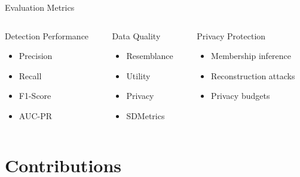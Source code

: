 \documentclass[aspectratio=169,xcolor={dvipsnames}]{beamer}
\begin{document}
\begin{frame}{Evaluation Metrics}
  \begin{columns}[T,onlytextwidth]
    \begin{column}{0.32\textwidth}
      \begin{block}{Detection Performance}
        \begin{itemize}
          \item Precision
          \item Recall
          \item F1-Score
          \item AUC-PR
        \end{itemize}
      \end{block}
    \end{column}
    \hspace{0.02\textwidth}
    \begin{column}{0.32\textwidth}
      \begin{block}{Data Quality}
        \begin{itemize}
          \item Resemblance
          \item Utility
          \item Privacy
          \item SDMetrics
        \end{itemize}
      \end{block}
    \end{column}
    \hspace{0.02\textwidth}
    \begin{column}{0.32\textwidth}
      \begin{block}{Privacy Protection}
        \begin{itemize}
          \item Membership inference
          \item Reconstruction attacks
          \item Privacy budgets
        \end{itemize}
      \end{block}
    \end{column}
  \end{columns}
\end{frame}

\section{Contributions}
\end{document}
